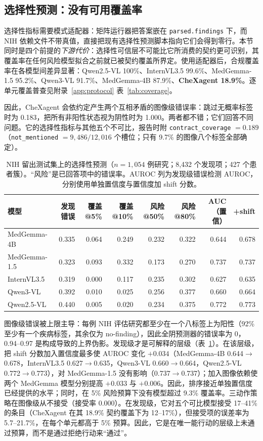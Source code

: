 \subsection{选择性预测：没有可用覆盖率}
\label{sec:results-selective}

选择性指标需要模式适配器：矩阵运行器把答案嵌在 \texttt{parsed.findings} 下，而 NIH 依赖文件不带真值，直接把现有选择性预测脚本指向它们会得到零行。本节同时是四个前提的\emph{下游代价}：选择性可信层不可能比它所消费的契约更可识别，其覆盖率在任何风险模型拟合之前就已被契约覆盖所界定。使用适配器后，合规覆盖率在各模型间差异显著：Qwen2.5-VL 100\%、InternVL3.5 99.6\%、MedGemma-1.5 95.2\%、Qwen3-VL 91.7\%、MedGemma-4B 87.9\%、\textbf{CheXagent 18.9\%}。逐单元覆盖普查见附录~\ref{app:protocol} 表~\ref{tab:coverage}。

因此，CheXagent 会依约定产生两个互相矛盾的图像级错误率：跳过无概率标签时为 0.183，把所有非阳性状态视为阴性时为 1.000。两者都不错；它们回答不同问题。它的选择性指标与其他五个不可比，报告时附 \texttt{contract\_coverage} $=0.189$（\texttt{not\_mentioned} $=9{,}486/12{,}016$ 个槽位；只有 9.7\% 的图像八个标签全部确定）。

\begin{table}[t]
\centering
\footnotesize
\setlength{\tabcolsep}{2pt}
\caption{NIH 留出测试集上的选择性预测（$n=1{,}054$ 例研究；8,432 个发现项；427 个患者簇）。``风险''是已回答项中的错误率。AUROC 列为发现级错误检测 AUROC，分别使用单独置信度与置信度加 shift 分数。}
\label{tab:selective}
\begin{tabular}{lrrrrrrr}
\toprule
模型 & 发现错误 & 覆盖@5\% & 覆盖@10\% & 风险@50\% & 风险@80\% & AUC（置信） & +shift \\
\midrule
MedGemma-4B & 0.335 & 0.064 & 0.249 & 0.232 & 0.322 & 0.644 & 0.678 \\
MedGemma-1.5 & 0.323 & 0.093 & 0.332 & 0.173 & 0.270 & 0.737 & 0.737 \\
InternVL3.5 & 0.319 & 0.000 & 0.117 & 0.235 & 0.302 & 0.627 & 0.635 \\
Qwen3-VL & 0.392 & 0.010 & 0.025 & 0.256 & 0.377 & 0.660 & 0.664 \\
Qwen2.5-VL & 0.440 & 0.005 & 0.020 & 0.234 & 0.375 & 0.772 & 0.773 \\
\bottomrule
\end{tabular}
\end{table}

图像级错误被上限主导：每例 NIH 评估研究都至少在一个八标签上为阳性（92\% 至少有一个疾病标签，其余仅为 no-finding），因此全阴预测器的错误率为 0，0.94--0.97 是构成导致的上界伪影。发现级才是可解释的层级（表~\ref{tab:selective}）。在该层级，把 shift 分数加入置信度最多使 AUROC 变化 $+0.034$（MedGemma-4B 0.644$\rightarrow$0.678，InternVL3.5 0.627$\rightarrow$0.635，Qwen3-VL 0.660$\rightarrow$0.664，Qwen2.5-VL 0.772$\rightarrow$0.773），对 MedGemma-1.5 没有影响（0.737$\rightarrow$0.737）；加入图像依赖使两个 MedGemma 模型分别提高 $+0.033$ 与 $+0.006$。因此，排序接近单独置信度已经提供的水平；同时，在 5\% 风险预算下没有模型超过 9.3\% 覆盖率。三动作策略在图像级从不接受（接受率 0.000）。在发现级，它对五个可比模型接受 17--41\% 的条目（CheXagent 在其 18.9\% 契约覆盖下为 12--17\%），但接受项的误差率为 5.7--21.7\%，在每个单元都高于 5\% 预算。因此，它是在唯一能行动的层级上未通过预算，而不是通过拒绝行动来``通过''。

